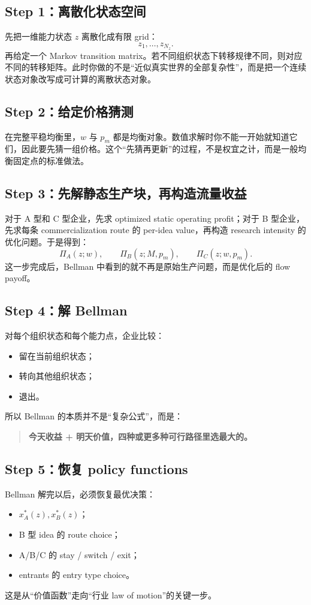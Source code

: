 \documentclass[12pt]{ctexart}
\begin{document}
\subsection{Step 1：离散化状态空间}
先把一维能力状态 $z$ 离散化成有限 grid：
\[
z_1,\dots,z_{N_z}.
\]
再给定一个 Markov transition matrix。若不同组织状态下转移规律不同，则对应不同的转移矩阵。此时你做的不是“近似真实世界的全部复杂性”，而是把一个连续状态对象改写成可计算的离散状态对象。

\subsection{Step 2：给定价格猜测}
在完整平稳均衡里，$w$ 与 $p_m$ 都是均衡对象。数值求解时你不能一开始就知道它们，因此要先猜一组价格。这个“先猜再更新”的过程，不是权宜之计，而是一般均衡固定点的标准做法。

\subsection{Step 3：先解静态生产块，再构造流量收益}
对于 A 型和 C 型企业，先求 optimized static operating profit；对于 B 型企业，先求每条 commercialization route 的 per-idea value，再构造 research intensity 的优化问题。于是得到：
\[
\Pi_A(z;w),\qquad \Pi_B(z;M,p_m),\qquad \Pi_C(z;w,p_m).
\]
这一步完成后，Bellman 中看到的就不再是原始生产问题，而是优化后的 flow payoff。

\subsection{Step 4：解 Bellman}
对每个组织状态和每个能力点，企业比较：
\begin{itemize}[leftmargin=2em]
    \item 留在当前组织状态；
    \item 转向其他组织状态；
    \item 退出。
\end{itemize}
所以 Bellman 的本质并不是“复杂公式”，而是：
\begin{quote}
\textbf{今天收益 + 明天价值，四种或更多种可行路径里选最大的。}
\end{quote}

\subsection{Step 5：恢复 policy functions}
Bellman 解完以后，必须恢复最优决策：
\begin{itemize}[leftmargin=2em]
    \item $x_A^*(z),x_B^*(z)$；
    \item B 型 idea 的 route choice；
    \item A/B/C 的 stay / switch / exit；
    \item entrants 的 entry type choice。
\end{itemize}
这是从“价值函数”走向“行业 law of motion”的关键一步。
\end{document}
